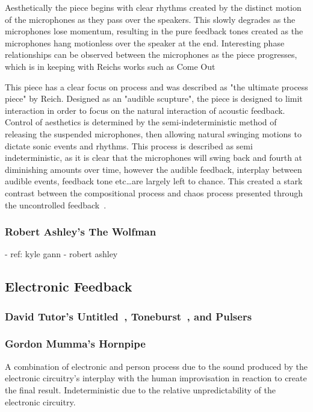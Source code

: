 \documentclass[titlepage]{scrartcl}
\begin{document}
    Aesthetically the piece begins with clear rhythms created by the distinct
    motion of the microphones as they pass over the speakers. This slowly
    degrades as the microphones lose momentum, resulting in the pure feedback
    tones created as the microphones hang motionless over the speaker at the
    end. Interesting phase relationships can be observed between the
    microphones as the piece progresses, which is in keeping with Reichs works
    such as Come Out~\citeyearpar{reich1966comeout}

    This piece has a clear focus on process and was described as "the ultimate
    process piece" by Reich.  Designed as an "audible scupture", the piece is
    designed to limit interaction in order to focus on the natural interaction
    of acoustic feedback. Control of aesthetics is determined by the
    semi-indeterministic method of releasing the suspended microphones, then
    allowing natural swinging motions to dictate sonic events and rhythms. This
    process is described as semi indeterministic, as it is clear that the
    microphones will swing back and fourth at diminishing amounts over time,
    however the audible feedback, interplay between audible events, feedback
    tone etc\ldots are largely left to chance. This created a stark contrast
    between the compositional process and chaos process presented through the
    uncontrolled feedback~\parencite[p.186]{holmes2012eaem}.
    
    
    \subsubsection{Robert Ashley's The Wolfman~\citeyearpar{ashley2003w}}\label{wolfman}
    - ref: kyle gann - robert ashley
    

    \subsection{Electronic Feedback}\label{ElecFeed}
    \subsubsection{David Tutor's Untitled~\citeyearpar{tudor1996twfle}, Toneburst~\citeyearpar{tudor2004lem}, and Pulsers~\citeyearpar{tudor1996twfle}}
    \subsubsection{Gordon Mumma's Hornpipe~\citeyearpar{mumma2002lem}}\label{hornpipe}
    A combination of electronic and person process due to the sound produced by
    the electronic circuitry's interplay with the human improvisation in
    reaction to create the final result.
    Indeterministic due to the relative unpredictability of the electronic
    circuitry.
\end{document}
